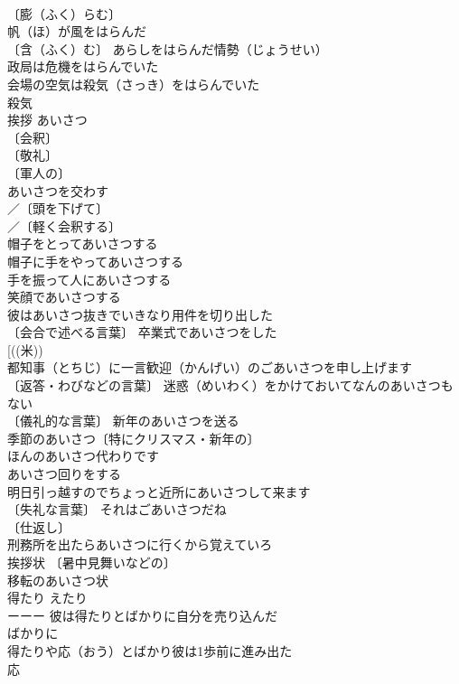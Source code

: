 \documentclass[8pt]{extreport}
\begin{document}
\begin{CJK}{UTF8}{min}
\\	〔膨（ふく）らむ〕　
\\	帆（ほ）が風をはらんだ 
\\	〔含（ふく）む〕 あらしをはらんだ情勢（じょうせい） 
\\	政局は危機をはらんでいた 
\\	会場の空気は殺気（さっき）をはらんでいた 
\\	殺気　
\\	挨拶	あいさつ	
\\	〔会釈〕
\\	〔敬礼〕
\\	〔軍人の〕
\\	あいさつを交わす 
\\	／〔頭を下げて〕
\\	／〔軽く会釈する〕
\\	帽子をとってあいさつする 
\\	帽子に手をやってあいさつする 
\\	手を振って人にあいさつする 
\\	笑顔であいさつする 
\\	彼はあいさつ抜きでいきなり用件を切り出した 
\\	〔会合で述べる言葉〕 卒業式であいさつをした 
\\	[((米)) 
\\	都知事（とちじ）に一言歓迎（かんげい）のごあいさつを申し上げます 
\\	〔返答・わびなどの言葉〕 迷惑（めいわく）をかけておいてなんのあいさつもない 
\\	〔儀礼的な言葉〕 新年のあいさつを送る 
\\	季節のあいさつ〔特にクリスマス・新年の〕 
\\	ほんのあいさつ代わりです 
\\	あいさつ回りをする 
\\	明日引っ越すのでちょっと近所にあいさつして来ます 
\\	〔失礼な言葉〕 それはごあいさつだね 
\\	〔仕返し〕　
\\	刑務所を出たらあいさつに行くから覚えていろ 
\\	挨拶状 〔暑中見舞いなどの〕
\\	移転のあいさつ状 
\\	得たり	えたり	
\\	ーーー 彼は得たりとばかりに自分を売り込んだ 
\\	ばかりに 
\\	得たりや応（おう）とばかり彼は1歩前に進み出た 
\\	応 

\end{CJK}
\end{document}
